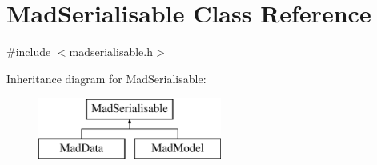 \hypertarget{class_mad_serialisable}{\section{Mad\-Serialisable Class Reference}
\label{class_mad_serialisable}
}


{\ttfamily \#include $<$madserialisable.\-h$>$}

Inheritance diagram for Mad\-Serialisable\-:\begin{figure}[H]
\begin{center}
\leavevmode
\includegraphics[height=2.000000cm]{class_mad_serialisable}
\end{center}
\end{figure}
